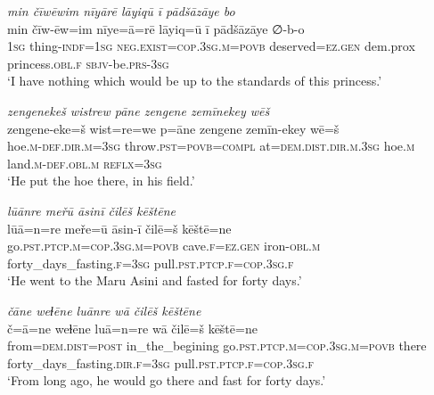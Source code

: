\ea \label{ZP.105}
\textit{min čīwēwim nīyārē lāyiqū ī pādšāzāye bo} \\ 
\gll min čīw-ēw=im nīye=ā=rē lāyiq=ū ī pādšāzāye ∅-b-o \\ 
 \textsc{1sg} thing\textsc{-indf}\textsc{=\textsc{1sg}} \textsc{\textsc{neg.}exist}\textsc{=cop}\textsc{.3sg}\textsc{.m}\textsc{=\textsc{povb}} deserved\textsc{\textsc{=ez.gen}} dem.prox princess\textsc{.obl}\textsc{.f} \textsc{sbjv-}be\textsc{.prs}\textsc{-3sg} \\ 
\glt `I have nothing which would be up to the standards of this princess.'
\z 
 
\ea \label{ŽP.52}
\textit{zengenekeš wistrew pāne zengene zemīnekey wēš} \\ 
\gll zengene-eke=š wist=re=we p=āne zengene zemīn-ekey wē=š \\ 
 hoe\textsc{.m}\textsc{-def}\textsc{.dir}\textsc{.m}\textsc{=3sg} throw\textsc{.pst}\textsc{=\textsc{povb}}\textsc{=compl} at=\textsc{dem.dist}\textsc{.dir}\textsc{.m}\textsc{.3sg} hoe\textsc{.m} land\textsc{.m}\textsc{-def}\textsc{.obl}\textsc{.m} \textsc{reflx}\textsc{=3sg} \\ 
\glt `He put the hoe there, in his field.'
\z 
 
\ea \label{ŽP.118}
\textit{lūānre meřū āsinī čilēš kēštēne} \\ 
\gll lūā=n=re meře=ū āsin-ī čilē=š kēštē=ne \\ 
 go\textsc{.pst}\textsc{.ptcp}\textsc{.m}\textsc{=cop}\textsc{.3sg}\textsc{.m}\textsc{=\textsc{povb}} cave\textsc{.f}\textsc{\textsc{=ez.gen}} iron\textsc{-obl}\textsc{.m} forty\_days\_fasting\textsc{.f}\textsc{=3sg} pull\textsc{.pst}\textsc{.ptcp}\textsc{.f}\textsc{=cop}\textsc{.3sg}\textsc{.f} \\ 
\glt `He went to the Maru Asini and fasted for forty days.'
\z 
 
\ea \label{ŽP.119}
\textit{čāne weɫēne luānre wā čilēš kēštēne} \\ 
\gll č=ā=ne weɫēne luā=n=re wā čilē=š kēštē=ne \\ 
 from=\textsc{dem.dist}\textsc{=\textsc{post}} in\_the\_begining go\textsc{.pst}\textsc{.ptcp}\textsc{.m}\textsc{=cop}\textsc{.3sg}\textsc{.m}\textsc{=\textsc{povb}} there forty\_days\_fasting\textsc{.dir}\textsc{.f}\textsc{=3sg} pull\textsc{.pst}\textsc{.ptcp}\textsc{.f}\textsc{=cop}\textsc{.3sg}\textsc{.f} \\ 
\glt `From long ago, he would go there and fast for forty days.'
\z 
 
